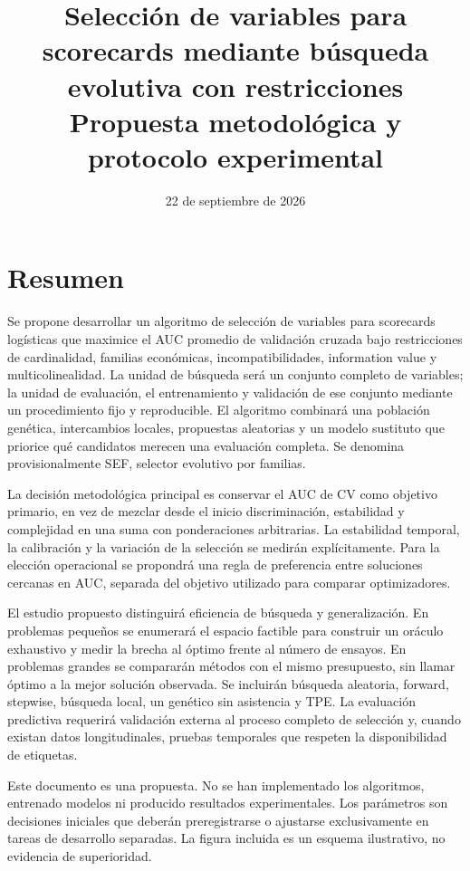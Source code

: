 \documentclass[11pt,letterpaper]{article}
\title{Selección de variables para scorecards mediante búsqueda evolutiva con restricciones\\[6pt]\large Propuesta metodológica y protocolo experimental}
\author{}
\date{22 de septiembre de 2026}
\begin{document}
\maketitle

\section*{Resumen}

Se propone desarrollar un algoritmo de selección de variables para scorecards logísticas que maximice el AUC promedio de validación cruzada bajo restricciones de cardinalidad, familias económicas, incompatibilidades, information value y multicolinealidad. La unidad de búsqueda será un conjunto completo de variables; la unidad de evaluación, el entrenamiento y validación de ese conjunto mediante un procedimiento fijo y reproducible. El algoritmo combinará una población genética, intercambios locales, propuestas aleatorias y un modelo sustituto que priorice qué candidatos merecen una evaluación completa. Se denomina provisionalmente SEF, selector evolutivo por familias.

La decisión metodológica principal es conservar el AUC de CV como objetivo primario, en vez de mezclar desde el inicio discriminación, estabilidad y complejidad en una suma con ponderaciones arbitrarias. La estabilidad temporal, la calibración y la variación de la selección se medirán explícitamente. Para la elección operacional se propondrá una regla de preferencia entre soluciones cercanas en AUC, separada del objetivo utilizado para comparar optimizadores.

El estudio propuesto distinguirá eficiencia de búsqueda y generalización. En problemas pequeños se enumerará el espacio factible para construir un oráculo exhaustivo y medir la brecha al óptimo frente al número de ensayos. En problemas grandes se compararán métodos con el mismo presupuesto, sin llamar óptimo a la mejor solución observada. Se incluirán búsqueda aleatoria, forward, stepwise, búsqueda local, un genético sin asistencia y TPE. La evaluación predictiva requerirá validación externa al proceso completo de selección y, cuando existan datos longitudinales, pruebas temporales que respeten la disponibilidad de etiquetas.

Este documento es una propuesta. No se han implementado los algoritmos, entrenado modelos ni producido resultados experimentales. Los parámetros son decisiones iniciales que deberán preregistrarse o ajustarse exclusivamente en tareas de desarrollo separadas. La figura incluida es un esquema ilustrativo, no evidencia de superioridad.
\end{document}
